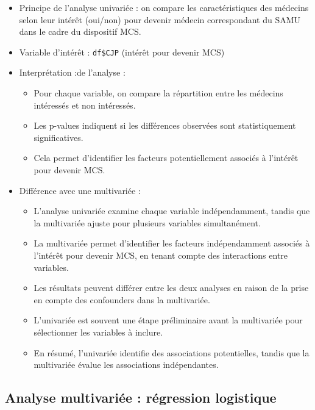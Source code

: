 \documentclass[
]{article}
\begin{document}
\begin{itemize}
\item
  Principe de l'analyse univariée : on compare les caractéristiques des
  médecins selon leur intérêt (oui/non) pour devenir médecin
  correspondant du SAMU dans le cadre du dispositif MCS.
\item
  Variable d'intérêt : \texttt{df\$CJP} (intérêt pour devenir MCS)
\item
  Interprétation :de l'analyse :

  \begin{itemize}
  \item
    Pour chaque variable, on compare la répartition entre les médecins
    intéressés et non intéressés.
  \item
    Les p-values indiquent si les différences observées sont
    statistiquement significatives.
  \item
    Cela permet d'identifier les facteurs potentiellement associés à
    l'intérêt pour devenir MCS.
  \end{itemize}
\item
  Différence avec une multivariée :

  \begin{itemize}
  \item
    L'analyse univariée examine chaque variable indépendamment, tandis
    que la multivariée ajuste pour plusieurs variables simultanément.
  \item
    La multivariée permet d'identifier les facteurs indépendamment
    associés à l'intérêt pour devenir MCS, en tenant compte des
    interactions entre variables.
  \item
    Les résultats peuvent différer entre les deux analyses en raison de
    la prise en compte des confounders dans la multivariée.
  \item
    L'univariée est souvent une étape préliminaire avant la multivariée
    pour sélectionner les variables à inclure.
  \item
    En résumé, l'univariée identifie des associations potentielles,
    tandis que la multivariée évalue les associations indépendantes.
  \end{itemize}
\end{itemize}

\subsection{Analyse multivariée : régression
logistique}\label{analyse-multivariuxe9e-ruxe9gression-logistique}
\end{document}
